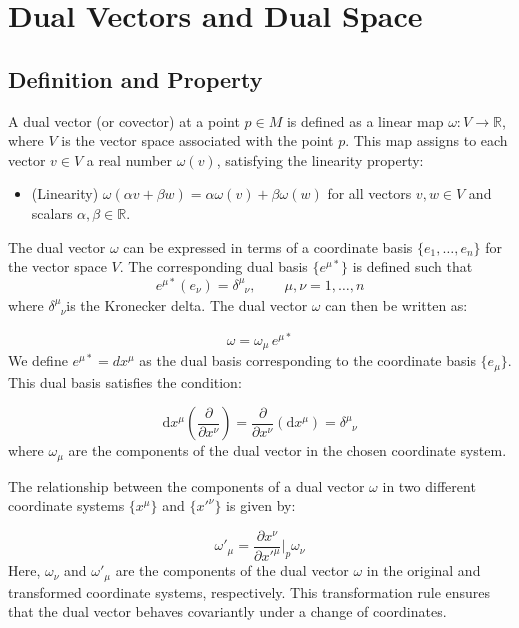 \documentclass{article}
\begin{document}
\section{Dual Vectors and Dual Space}
\subsection{Definition and Property}

A dual vector (or covector) at a point \( p \in M \) is defined as a linear map \( \omega: V \rightarrow \mathbb{R} \), where \( V \) is the vector space associated with the point \( p \). This map assigns to each vector \( v \in V \) a real number \( \omega(v) \), satisfying the linearity property:

\begin{itemize}
    \item (Linearity) \( \omega(\alpha v + \beta w) = \alpha \omega(v) + \beta \omega(w) \) for all vectors \( v, w \in V \) and scalars \( \alpha, \beta \in \mathbb{R} \).
\end{itemize}

The dual vector \( \omega \) can be expressed in terms of a coordinate basis \( \{e_1, \dots, e_n\} \) for the vector space \( V \). The corresponding dual basis \(\{e^{\mu*}\}\) is defined such that \[ e^{\mu*}(e_\nu) = \delta^\mu_{\phantom{\mu}\nu} ,\qquad \mu,\nu =1,\ldots,n\]where \( \delta^\mu_{\phantom{\mu}\nu} \)is the Kronecker delta. The dual vector \( \omega \) can then be written as:

\[
\omega = \omega_\mu \, e^{\mu*}
\]
We define \( e^{\mu*} = dx^\mu \) as the dual basis corresponding to the coordinate basis \( \{e_\mu\} \). This dual basis satisfies the condition:

\[
\mathrm{d}x^\mu(\dfrac{\partial}{\partial x^\nu}) = \dfrac{\partial}{\partial x^\nu}(\mathrm{d}x^\mu)=\delta^\mu_{\phantom{\mu} \nu}
\]
where \( \omega_\mu \) are the components of the dual vector in the chosen coordinate system.

The relationship between the components of a dual vector \( \omega \) in two different coordinate systems \( \{ x^\mu\} \) and \( \{ x'^\nu\} \) is given by:

\[
\omega'_\mu = \frac{\partial x^\nu}{\partial x'^\mu} \bigg|_p\omega_\nu
\]
Here, \( \omega_\nu \) and \( \omega'_\mu \) are the components of the dual vector \( \omega \) in the original and transformed coordinate systems, respectively. This transformation rule ensures that the dual vector behaves covariantly under a change of coordinates.
\end{document}
